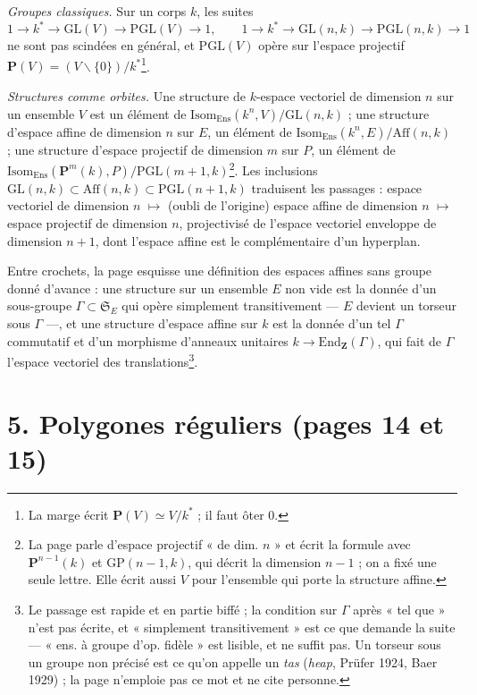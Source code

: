 \documentclass[11pt,a4paper]{article}
\begin{document}
\emph{Groupes classiques.} Sur un corps $k$, les suites
\[
  1 \to k^{*} \to \mathrm{GL}(V) \to \mathrm{PGL}(V) \to 1, \qquad
  1 \to k^{*} \to \mathrm{GL}(n, k) \to \mathrm{PGL}(n, k) \to 1
\]
ne sont pas scindées en général, et $\mathrm{PGL}(V)$ opère sur l'espace
projectif $\mathbf{P}(V) = (V \smallsetminus \{0\})/k^{*}$\footnote{La marge
écrit $\mathbf{P}(V) \simeq V/k^{*}$ ; il faut ôter $0$.}.

\emph{Structures comme orbites.} Une structure de $k$-espace vectoriel de
dimension $n$ sur un ensemble $V$ est un élément de
$\mathrm{Isom}_{\mathrm{Ens}}(k^n, V)/\mathrm{GL}(n, k)$ ; une structure
d'espace affine de dimension $n$ sur $E$, un élément de
$\mathrm{Isom}_{\mathrm{Ens}}(k^n, E)/\mathrm{Aff}(n, k)$ ; une structure
d'espace projectif de dimension $m$ sur $P$, un élément de
$\mathrm{Isom}_{\mathrm{Ens}}(\mathbf{P}^m(k), P)/\mathrm{PGL}(m+1,
k)$\footnote{La page parle d'espace projectif « de dim. $n$ » et écrit la
formule avec $\mathbf{P}^{n-1}(k)$ et $\mathrm{GP}(n-1, k)$, qui décrit la
dimension $n - 1$ ; on a fixé une seule lettre. Elle écrit aussi $V$ pour
l'ensemble qui porte la structure affine.}. Les inclusions $\mathrm{GL}(n, k)
\subset \mathrm{Aff}(n, k) \subset \mathrm{PGL}(n+1, k)$ traduisent les
passages : espace vectoriel de dimension $n$ $\mapsto$ (oubli de l'origine)
espace affine de dimension $n$ $\mapsto$ espace projectif de dimension $n$,
projectivisé de l'espace vectoriel enveloppe de dimension $n + 1$, dont
l'espace affine est le complémentaire d'un hyperplan.

Entre crochets, la page esquisse une définition des espaces affines sans
groupe donné d'avance : une structure sur un ensemble $E$ non vide est la
donnée d'un sous-groupe $\Gamma \subset \mathfrak{S}_E$ qui opère
simplement transitivement --- $E$ devient un torseur sous $\Gamma$ ---, et une
structure d'espace affine sur $k$ est la donnée d'un tel $\Gamma$ commutatif
et d'un morphisme d'anneaux unitaires $k \to \mathrm{End}_{\mathbf{Z}}(\Gamma)$,
qui fait de $\Gamma$ l'espace vectoriel des translations\footnote{Le passage
est rapide et en partie biffé ; la condition sur $\Gamma$ après « tel que »
n'est pas écrite, et « simplement transitivement » est ce que demande la
suite --- « ens. à groupe d'op. fidèle » est lisible, et ne suffit pas. Un
torseur sous un groupe non précisé est ce qu'on appelle un \emph{tas}
(\emph{heap}, Prüfer 1924, Baer 1929) ; la page n'emploie pas ce mot et ne cite
personne.}.

\section*{5. Polygones réguliers (pages 14 et 15)}
\end{document}
